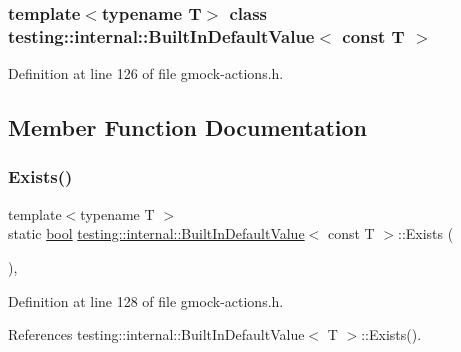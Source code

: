 \subsubsection*{template$<$typename T$>$\newline
class testing\+::internal\+::\+Built\+In\+Default\+Value$<$ const T $>$}



Definition at line 126 of file gmock-\/actions.\+h.



\subsection{Member Function Documentation}
\mbox{\label{classtesting_1_1internal_1_1BuiltInDefaultValue_3_01const_01T_01_4_a1814803ec5dcc660ee1f1092a96b79fa}} 
\subsubsection{\texorpdfstring{Exists()}{Exists()}}
{\footnotesize\ttfamily template$<$typename T $>$ \\
static \hyperlink{classbool}{bool} \hyperlink{classtesting_1_1internal_1_1BuiltInDefaultValue}{testing\+::internal\+::\+Built\+In\+Default\+Value}$<$ const T $>$\+::Exists (\begin{DoxyParamCaption}{ }\end{DoxyParamCaption})\hspace{0.3cm}{\ttfamily [inline]}, {\ttfamily [static]}}



Definition at line 128 of file gmock-\/actions.\+h.



References testing\+::internal\+::\+Built\+In\+Default\+Value$<$ T $>$\+::\+Exists().


